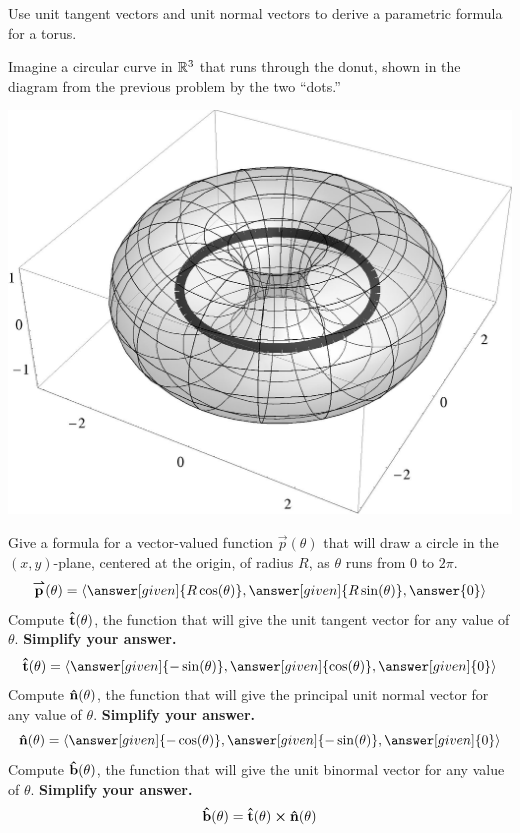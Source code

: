 \documentclass{ximera}
\begin{document}
\begin{example}
  Use unit tangent vectors and unit normal vectors to derive a
  parametric formula for a torus.
  \begin{explanation}
    Imagine a circular curve in $\mathbb R^3$ that runs through the donut,
    shown in the diagram from the previous problem by the two ``dots.''
    \begin{image}
      \includegraphics{transdonut.jpg}
    \end{image}
    Give a formula for a vector-valued function $\vec{p}(\theta)$ that will
    draw a circle in the $(x,y)$-plane, centered at the origin, of radius
    $R$, as $\theta$ runs from $0$ to $2\pi$.
    \[
    \vec{p}(\theta) = \vector{\answer[given]{R\cos(\theta)},\answer[given]{R\sin(\theta)},\answer{0}}
    \]
    Compute $\mathbf{\hat{t}}(\theta)$, the function that will give the unit tangent
    vector for any value of $\theta$. \textbf{Simplify your answer.}
    \[
    \utan(\theta) = \vector{\answer[given]{-\sin(\theta)},\answer[given]{\cos(\theta)},\answer[given]{0}}
    \]
    Compute $\mathbf{\hat{n}}(\theta)$, the function that will give the principal
    unit normal vector for any value of $\theta$. \textbf{Simplify your answer.}
    \[
    \unormal(\theta) =\vector{\answer[given]{-\cos(\theta)},\answer[given]{-\sin(\theta)},\answer[given]{0}}
    \]
    Compute $\mathbf{\hat{b}}(\theta)$, the function that will give the 
    unit binormal vector for any value of $\theta$. \textbf{Simplify your answer.}
    \begin{align*}
      \ubinormal(\theta) &= \utan(\theta)\cross\unormal(\theta)\\

\end{align*}
\end{explanation}
\end{example}
\end{document}
